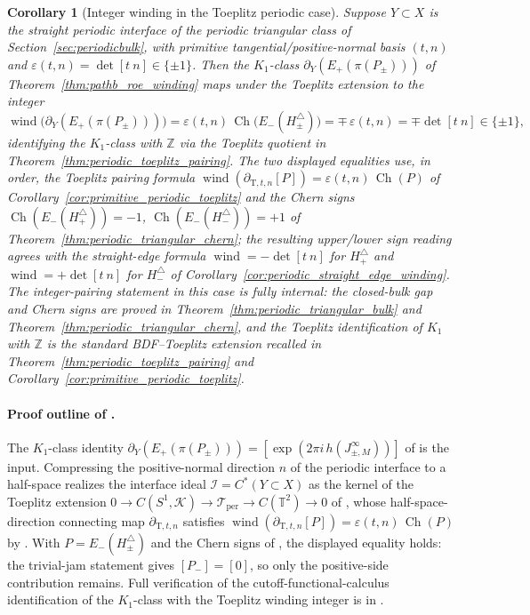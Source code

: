 \documentclass[11pt]{article}
\numberwithin{equation}{section}
\newtheorem{corollary}[theorem]{Corollary}
\theoremstyle{definition}
\theoremstyle{remark}
\newcommand{\Ch}{\operatorname{Ch}}
\begin{document}
\begin{corollary}[Integer winding in the Toeplitz periodic case]\label{cor:toeplitz_winding}
Suppose \(Y\subset X\) is the straight periodic interface of the periodic triangular class of
Section~\ref{sec:periodicbulk}, with primitive tangential/positive-normal basis \((t,n)\) and
\(\varepsilon(t,n)=\det[t\ n]\in\{\pm1\}\). Then the \(K_1\)-class
\(\partial_Y(E_+(\pi(P_\pm)))\) of Theorem~\ref{thm:pathb_roe_winding} maps under the
Toeplitz extension to the integer
\[
\operatorname{wind}\bigl(\partial_Y(E_+(\pi(P_\pm)))\bigr)
=\varepsilon(t,n)\,\Ch\bigl(E_-(H_\pm^\triangle)\bigr)
=\mp\,\varepsilon(t,n)
=\mp\det[t\ n]\in\{\pm 1\},
\]
identifying the \(K_1\)-class with \(\mathbb Z\) via the Toeplitz quotient in
Theorem~\ref{thm:periodic_toeplitz_pairing}. The two displayed equalities use, in order, the
Toeplitz pairing formula \(\operatorname{wind}(\partial_{\mathrm T,t,n}[P])
=\varepsilon(t,n)\,\Ch(P)\) of Corollary~\ref{cor:primitive_periodic_toeplitz} and the Chern
signs \(\Ch(E_-(H_+^\triangle))=-1\), \(\Ch(E_-(H_-^\triangle))=+1\) of
Theorem~\ref{thm:periodic_triangular_chern}; the resulting upper/lower sign reading agrees with
the straight-edge formula \(\operatorname{wind}=-\det[t\ n]\) for \(H_+^\triangle\) and
\(\operatorname{wind}=+\det[t\ n]\) for \(H_-^\triangle\) of
Corollary~\ref{cor:periodic_straight_edge_winding}. The integer-pairing statement in this case
is fully internal: the closed-bulk gap and Chern signs are proved in
Theorem~\ref{thm:periodic_triangular_bulk} and Theorem~\ref{thm:periodic_triangular_chern},
and the Toeplitz identification of \(K_1\) with \(\mathbb Z\) is the standard BDF--Toeplitz
extension recalled in Theorem~\ref{thm:periodic_toeplitz_pairing} and
Corollary~\ref{cor:primitive_periodic_toeplitz}.
\end{corollary}

\paragraph{Proof outline of .}
The \(K_1\)-class identity \(\partial_Y(E_+(\pi(P_\pm)))=[\exp(2\pi i\,h(J_{\pm,M}^\infty))]\)
of  is the input. Compressing the positive-normal direction \(n\)
of the periodic interface to a half-space realizes the interface ideal
\(\mathcal I=C^*(Y\subset X)\) as the kernel of the Toeplitz extension
\(0\to C(S^1,\mathcal K)\to\mathcal T_{\mathrm{per}}\to C(\mathbb T^2)\to 0\) of
, whose half-space-direction connecting map
\(\partial_{\mathrm T,t,n}\) satisfies
\(\operatorname{wind}(\partial_{\mathrm T,t,n}[P])=\varepsilon(t,n)\,\Ch(P)\) by
. With \(P=E_-(H_\pm^\triangle)\) and the Chern
signs of , the displayed equality holds: the trivial-jam
statement gives \([P_-]=[0]\), so only the positive-side contribution remains. Full
verification of the cutoff-functional-calculus identification of the \(K_1\)-class with the
Toeplitz winding integer is in .
\end{document}
